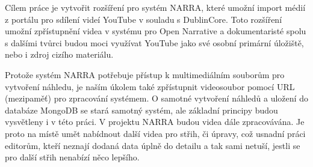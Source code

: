 \par Cílem práce je vytvořit rozšíření pro systém NARRA, které umožní import médií z portálu pro sdílení videí YouTube v souladu s DublinCore. Toto rozšíření umožní zpřístupnění videa v systému pro Open Narrative a dokumentaristé spolu s dalšími tvůrci budou moci využívat YouTube jako své osobní primární úložiště, nebo i zdroj cizího materiálu.
\par Protože systém NARRA potřebuje přístup k multimediálním souborům pro vytvoření náhledu, je naším úkolem také zpřístupnit videosoubor pomocí URL (mezipaměť) pro zpracování systémem. O samotné vytvoření náhledů a uložení do databáze MongoDB se stará samotný systém, ale základní principy budou vysvětleny i v této práci. V projektu NARRA budou videa dále zpracovávána. Je proto na místě umět nabídnout další videa pro střih, či úpravy, což usnadní práci editorům, kteří neznají dodaná data úplně do detailu a tak sami netuší, jestli se pro další střih nenabízí něco lepšího.